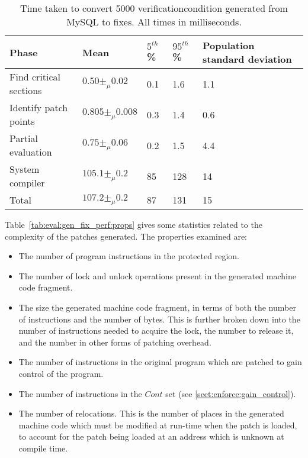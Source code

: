 \begin{table}
  \begin{tabular}{|l|l|l|l|l|}
    \hline
    Phase & Mean & $5^{th}$\% & $95^{th}$\% & Population standard deviation \\
    \hline
    Find critical sections & $0.50 \pm_\mu 0.02$ & 0.1 & 1.6 & 1.1 \\
    Identify patch points & $0.805 \pm_\mu 0.008$ & 0.3 & 1.4 & 0.6 \\
    Partial evaluation & $0.75 \pm_\mu 0.06$ & 0.2 & 1.5 & 4.4 \\
    System compiler & $105.1 \pm_\mu 0.2$ & 85 & 128 & 14 \\
    \hline
    Total & $107.2 \pm_\mu 0.2$ & 87 & 131 & 15 \\
    \hline
  \end{tabular}
  \caption{Time taken to convert 5000 \gls{verificationcondition}
    generated from MySQL to fixes.  All times in milliseconds.}
  \label{tab:eval:gen_fix_perf}
\end{table}

Table~\ref{tab:eval:gen_fix_perf:props} gives some statistics related
to the complexity of the patches generated.  The properties examined
are:

\begin{itemize}
\item The number of program instructions in the protected region.
\item The number of lock and unlock operations present in the
  generated machine code fragment.
\item The size the generated machine code fragment, in terms of both
  the number of instructions and the number of bytes.  This is further
  broken down into the number of instructions needed to acquire the
  lock, the number to release it, and the number in other forms of
  patching overhead.
\item The number of instructions in the original program which are
  patched to gain control of the program.
\item The number of instructions in the $\mathit{Cont}$ set (see
  \autoref{sect:enforce:gain_control}).
\item The number of relocations.  This is the number of places in the
  generated machine code which must be modified at run-time when the
  patch is loaded, to account for the patch being loaded at an address
  which is unknown at compile time.
\end{itemize}

